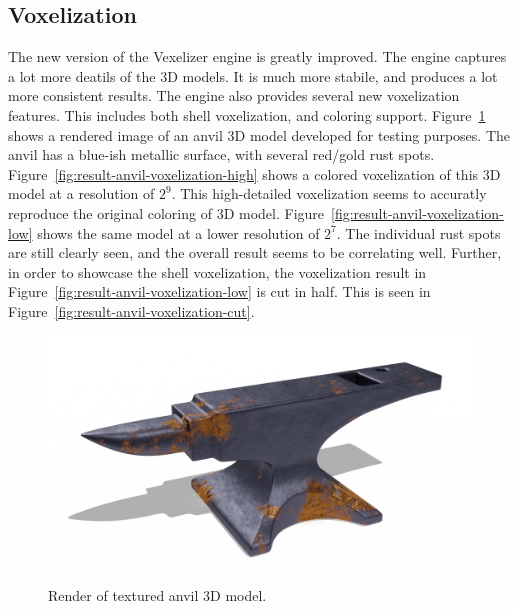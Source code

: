 \subsection{Voxelization}
The new version of the Vexelizer engine is greatly improved. The engine captures a lot more deatils of the 3D models. It is much more stabile, and produces a lot more consistent results. The engine also provides several new voxelization features. This includes both shell voxelization, and coloring support. Figure~\ref{fig:anvil-render} shows a rendered image of an anvil 3D model developed for testing purposes. The anvil has a blue-ish metallic surface, with several red/gold rust spots. Figure~\ref{fig:result-anvil-voxelization-high} shows a colored voxelization of this 3D model at a resolution of $2^9$. This high-detailed voxelization seems to accuratly reproduce the original coloring of 3D model. Figure~\ref{fig:result-anvil-voxelization-low} shows the same model at a lower resolution of $2^7$. The individual rust spots are still clearly seen, and the overall result seems to be correlating well. Further, in order to showcase the shell voxelization, the voxelization result in Figure~\ref{fig:result-anvil-voxelization-low} is cut in half. This is seen in Figure~\ref{fig:result-anvil-voxelization-cut}.
\begin{figure}[htp]
    \centering
    \includegraphics[width=\textwidth]{sections/result/figures/anvil-color-render.png}
    \caption{Render of textured anvil 3D model.}
    \label{fig:anvil-render}
\end{figure}
